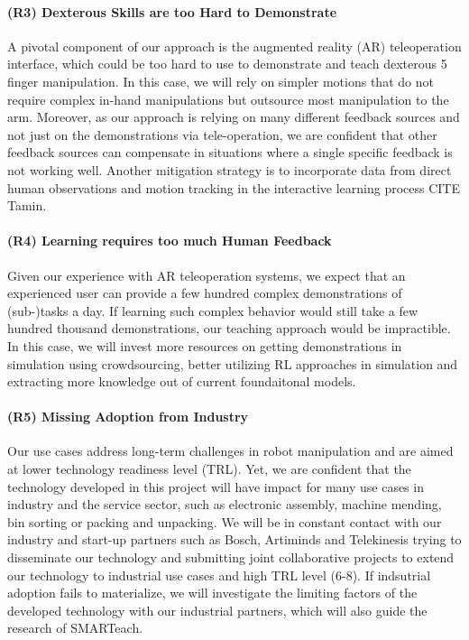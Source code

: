 \documentclass{erc-B2}
\begin{document}
\paragraph{(R3) Dexterous Skills are too Hard to Demonstrate}
A pivotal component of our approach is the augmented reality (AR) teleoperation interface, which could be too hard to use to demonstrate and teach dexterous 5 finger manipulation. In this case, we will rely on simpler motions that do not require complex in-hand manipulations but outsource most manipulation to the arm. Moreover, as our approach is relying on many different feedback sources and not just on the demonstrations via tele-operation, we are confident that other feedback sources can compensate in situations where a single specific feedback is not working well. Another mitigation strategy is to incorporate data from direct human observations and motion tracking in the interactive learning process CITE Tamin. 

\paragraph{(R4) Learning requires too much Human Feedback}
Given our experience with AR teleoperation systems, we expect that an experienced user can provide a few hundred complex demonstrations of (sub-)tasks a day. If learning such complex behavior would still take a few hundred thousand demonstrations, our teaching approach would be impractible. In this case, we will invest more resources on getting demonstrations in simulation using crowdsourcing, better utilizing RL approaches in simulation and extracting more knowledge out of current foundaitonal models. 

\paragraph{(R5) Missing Adoption from Industry} Our use cases address long-term challenges in robot manipulation and are aimed at lower technology readiness level (TRL). Yet, we are confident that the technology developed in this project will have impact for many use cases in industry and the service sector, such as electronic assembly, machine mending, bin sorting or packing and unpacking. We will be in constant contact with our industry  and start-up partners such as Bosch, Artiminds and Telekinesis trying to disseminate our technology and submitting joint collaborative projects to extend our technology to industrial use cases and high TRL level (6-8). If indsutrial adoption fails to materialize, we will investigate the limiting factors of the developed technology with our industrial partners, which will also guide the research of SMARTeach. 
\end{document}
